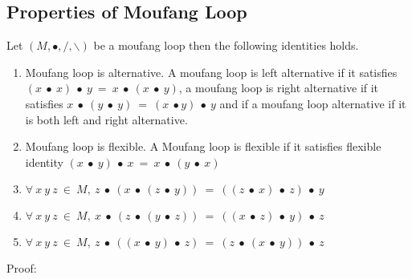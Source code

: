 \subsection{Properties of Moufang Loop}
Let $(M, ∙, /, \backslash)$ be a moufang loop then the following identities
holds.
\begin{enumerate}
\item Moufang loop is alternative. A moufang loop is left alternative if it
satisfies\\ $(x\ ∙\ x)\ ∙\ y\ =\ x\ ∙\ (x\ ∙\ y)$, a moufang loop is right
alternative if it satisfies $x\ ∙\ (y\ ∙\ y)\ =\ (x\ ∙ y)\ ∙\ y$ and if a moufang loop
alternative if it is both left and right alternative. 
\item Moufang loop is flexible. A Moufang loop is flexible if it satisfies
flexible identity $(x\ ∙\ y)\ ∙\ x\ =\ x\ ∙\ (y\ ∙\ x)$
\item $\forall\ x\ y\ z\ \in\ M,\ z\ ∙\ (x\ ∙\ (z\ ∙\ y))\ =\ ((z\ ∙\ x)\ ∙\ z)\ ∙\ y$
\item $\forall\ x\ y\ z\ \in\ M,\ x\ ∙\ (z\ ∙\ (y\ ∙\ z))\ =\ ((x\ ∙\ z)\ ∙\ y)\ ∙\ z$ 
\item $\forall\ x\ y\ z\ \in\ M,\ z\ ∙\ ((x\ ∙\ y)\ ∙\ z)\ =\ (z\ ∙ \ (x\ ∙\ y))\ ∙\ z$ 
\end{enumerate}
Proof:
